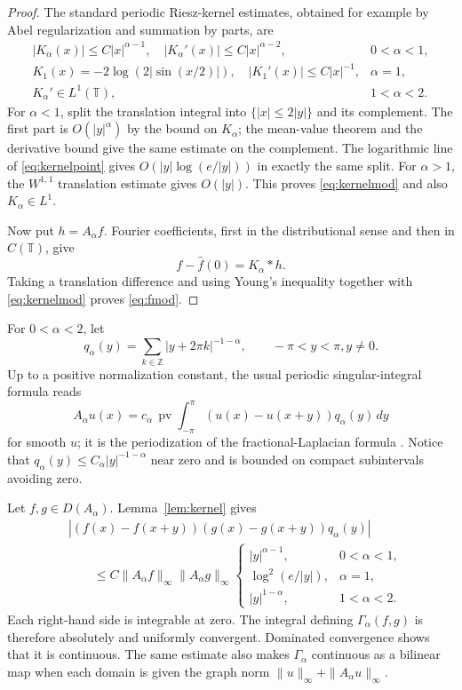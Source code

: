 \documentclass[11pt]{article}
\theoremstyle{remark}
\newcommand{\T}{\mathbb T}
\newcommand{\wh}{\widehat}
\begin{document}
\begin{proof}
The standard periodic Riesz-kernel estimates, obtained for example by Abel
regularization and summation by parts, are
\[
 \begin{array}{ll}
 |K_\alpha(x)|\le C|x|^{\alpha-1},\quad
 |K_\alpha'(x)|\le C|x|^{\alpha-2},&0<\alpha<1,\\[2mm]
 K_1(x)=-2\log(2|\sin(x/2)|),\quad
 |K_1'(x)|\le C|x|^{-1},&\alpha=1,\\[2mm]
 K_\alpha'\in L^1(\T),&1<\alpha<2.
 \end{array}
\tag{5}\label{eq:kernelpoint}
\]
For $\alpha<1$, split the translation integral into
$\{|x|\le2|y|\}$ and its complement. The first part is $O(|y|^\alpha)$
by the bound on $K_\alpha$; the mean-value theorem and the derivative bound
give the same estimate on the complement. The logarithmic line of
\eqref{eq:kernelpoint} gives $O(|y|\log(e/|y|))$ in exactly the same split.
For $\alpha>1$, the $W^{1,1}$ translation estimate gives $O(|y|)$. This
proves \eqref{eq:kernelmod} and also $K_\alpha\in L^1$.

Now put $h=A_\alpha f$. Fourier coefficients, first in the distributional
sense and then in $C(\T)$, give
\[
              f-\wh f(0)=K_\alpha*h.
\]
Taking a translation difference and using Young's inequality together with
\eqref{eq:kernelmod} proves \eqref{eq:fmod}.
\end{proof}

For $0<\alpha<2$, let
\[
 q_\alpha(y)=\sum_{k\in\mathbb Z}|y+2\pi k|^{-1-\alpha},
 \qquad -\pi<y<\pi, y\ne0.
\]
Up to a positive normalization constant, the usual periodic singular-integral
formula reads
\[
 A_\alpha u(x)=c_\alpha\,\operatorname{pv}
 \int_{-\pi}^{\pi}(u(x)-u(x+y))q_\alpha(y)\,dy
\tag{6}\label{eq:singint}
\]
for smooth $u$; it is the periodization of the fractional-Laplacian formula
\cite{Stinga}. Notice that $q_\alpha(y)\le C_\alpha|y|^{-1-\alpha}$ near
zero and is bounded on compact subintervals avoiding zero.

Let $f,g\in D(A_\alpha)$. Lemma~\ref{lem:kernel} gives
\[
 \begin{aligned}
 &|(f(x)-f(x+y))(g(x)-g(x+y))q_\alpha(y)|\\
 &\qquad\le C\|A_\alpha f\|_\infty\|A_\alpha g\|_\infty
 \begin{cases}
 |y|^{\alpha-1},&0<\alpha<1,\\
 \log^2(e/|y|),&\alpha=1,\\
 |y|^{1-\alpha},&1<\alpha<2.
 \end{cases}
\end{aligned}
\tag{7}\label{eq:majorant}
\]
Each right-hand side is integrable at zero. The integral defining
$\Gamma_\alpha(f,g)$ is therefore absolutely and uniformly convergent.
Dominated convergence shows that it is continuous. The same estimate also
makes $\Gamma_\alpha$ continuous as a bilinear map when each domain is given
the graph norm $\|u\|_\infty+\|A_\alpha u\|_\infty$.
\end{document}
